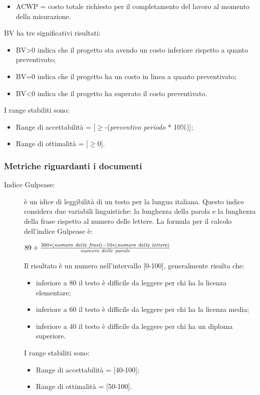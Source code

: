 \begin{description}
\begin{itemize}
        \item ACWP = costo totale richiesto per il completamento del lavoro al momento della misurazione.
      \end{itemize}
      BV ha tre significativi risultati:
      \begin{itemize}
        \item BV>0 indica che il progetto sta avendo un costo inferiore rispetto a quanto preventivato;
        \item BV=0 indica che il progetto ha un costo in linea a quanto preventivato;
        \item BV<0 indica che il progetto ha superato il costo preventivato.
      \end{itemize}
      I range stabiliti sono:
      \begin{itemize}
        \item Range di accettabilità = [\(\geq\)-(\emph{preventivo periodo} * 10\%)];
        \item Range di ottimalità = [\(\geq\)0].
      \end{itemize}
    \end{description}
    \subsubsection{Metriche riguardanti i documenti}
    \begin{description}
      \item[Indice Gulpease:] è un idice di leggibilità di un testo per la lungua italiana.
      Questo indice considera due variabili linguistiche: la lunghezza della parola e la lunghezza della frase rispetto al numero delle lettere.
      La formula per il calcolo dell'indice Gulpease è:
      \begin{center}
        \( 89+\frac{300 * (\emph{numero delle frasi}) - 10 * (\emph{numero delle lettere})}{\emph{numero delle parole}} \)
      \end{center}
      Il risultato è un numero nell'intervallo [0-100], generalmente risulta che:
      \begin{itemize}
        \item inferiore a 80 il testo è difficile da leggere per chi ha la licenza elementare;
        \item inferiore a 60 il testo è difficile da leggere per chi ha la licenza media;
        \item inferiore a 40 il testo è difficile da leggere per chi ha un diploma superiore.
      \end{itemize}
      I range stabiliti sono:
      \begin{itemize}
        \item Range di accettabilità = [40-100];
        \item Range di ottimalità = [50-100].
      \end{itemize}
    \end{description}
